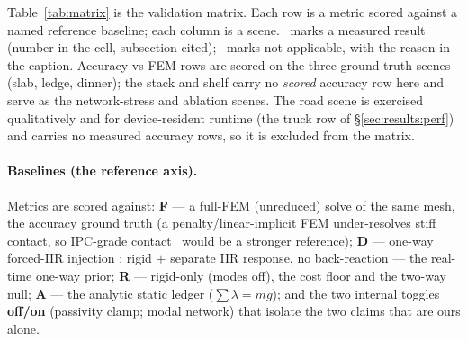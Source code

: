 Table~\ref{tab:matrix} is the validation matrix. Each row is a metric scored against
a named reference baseline; each column is a scene. \yes\ marks a measured result
(number in the cell, subsection cited); \na\ marks not-applicable, with the
reason in the caption. Accuracy-vs-FEM rows are scored on the three
ground-truth scenes (slab, ledge, dinner); the stack and shelf carry no
\emph{scored} accuracy row here and serve as the network-stress and ablation
scenes. The road scene is
exercised qualitatively and for device-resident runtime (the truck row of
\S\ref{sec:results:perf}) and carries no measured accuracy rows, so it is
excluded from the matrix.

\paragraph*{Baselines (the reference axis).} Metrics are scored against:
\textbf{F} --- a full-FEM (unreduced) solve of the same mesh, the accuracy ground
truth (a penalty/linear-implicit FEM under-resolves stiff contact, so
IPC-grade contact~\citep{lan2022abd} would be a stronger reference);
\textbf{D} --- one-way forced-IIR injection \citep{coevoet2020distant}:
rigid $+$ separate IIR response, no back-reaction --- the real-time one-way
prior;
\textbf{R} --- rigid-only (modes off), the cost floor and the two-way null;
\textbf{A} --- the analytic static ledger ($\sum\lambda = mg$);
and the two internal toggles \textbf{off/on} (passivity clamp; modal network) that
isolate the two claims that are ours alone.

